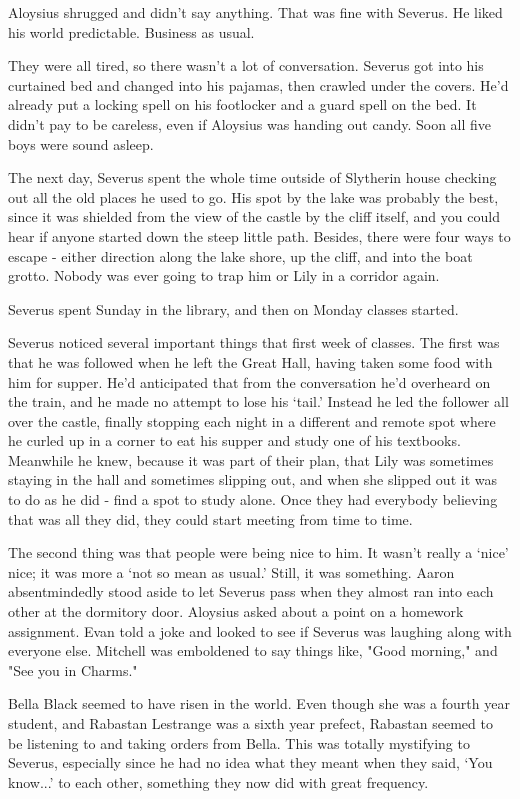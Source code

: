 \documentclass[a4paper,11pt]{article}
\begin{document}
Aloysius shrugged and didn't say anything. That was fine with Severus. He liked his world predictable. Business as usual.

They were all tired, so there wasn't a lot of conversation. Severus got into his curtained bed and changed into his pajamas, then crawled under the covers. He'd already put a locking spell on his footlocker and a guard spell on the bed. It didn't pay to be careless, even if Aloysius was handing out candy. Soon all five boys were sound asleep.

The next day, Severus spent the whole time outside of Slytherin house checking out all the old places he used to go. His spot by the lake was probably the best, since it was shielded from the view of the castle by the cliff itself, and you could hear if anyone started down the steep little path. Besides, there were four ways to escape - either direction along the lake shore, up the cliff, and into the boat grotto. Nobody was ever going to trap him or Lily in a corridor again.

Severus spent Sunday in the library, and then on Monday classes started.

Severus noticed several important things that first week of classes. The first was that he was followed when he left the Great Hall, having taken some food with him for supper. He'd anticipated that from the conversation he'd overheard on the train, and he made no attempt to lose his `tail.' Instead he led the follower all over the castle, finally stopping each night in a different and remote spot where he curled up in a corner to eat his supper and study one of his textbooks. Meanwhile he knew, because it was part of their plan, that Lily was sometimes staying in the hall and sometimes slipping out, and when she slipped out it was to do as he did - find a spot to study alone. Once they had everybody believing that was all they did, they could start meeting from time to time.

The second thing was that people were being nice to him. It wasn't really a `nice' nice; it was more a `not so mean as usual.' Still, it was something. Aaron absentmindedly stood aside to let Severus pass when they almost ran into each other at the dormitory door. Aloysius asked about a point on a homework assignment. Evan told a joke and looked to see if Severus was laughing along with everyone else. Mitchell was emboldened to say things like, "Good morning," and "See you in Charms."

Bella Black seemed to have risen in the world. Even though she was a fourth year student, and Rabastan Lestrange was a sixth year prefect, Rabastan seemed to be listening to and taking orders from Bella. This was totally mystifying to Severus, especially since he had no idea what they meant when they said, `You know...' to each other, something they now did with great frequency.
\end{document}
